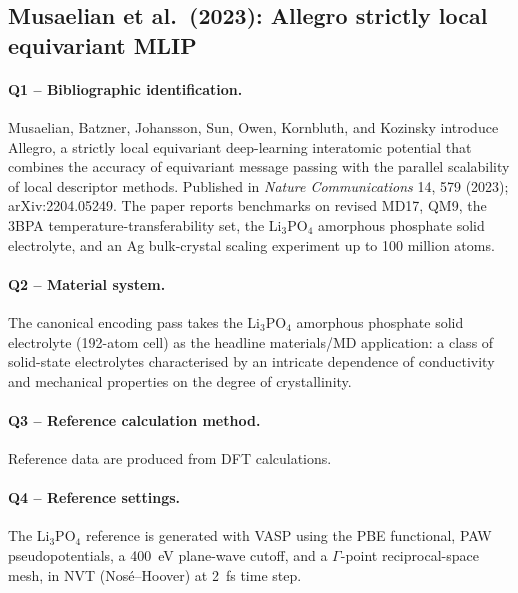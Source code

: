 \subsection{Musaelian et al.\ (2023): Allegro strictly local equivariant MLIP}
\label{sec:appendix-example-musaelian2023allegro}

\paragraph{Q1 -- Bibliographic identification.}
Musaelian, Batzner, Johansson, Sun, Owen, Kornbluth, and Kozinsky
introduce Allegro, a strictly local equivariant deep-learning
interatomic potential that combines the accuracy of equivariant
message passing with the parallel scalability of local descriptor
methods. Published in \emph{Nature Communications} 14, 579 (2023);
arXiv:2204.05249. The paper reports benchmarks on revised MD17,
QM9, the 3BPA temperature-transferability set, the Li$_3$PO$_4$
amorphous phosphate solid electrolyte, and an Ag bulk-crystal
scaling experiment up to 100 million atoms.


\paragraph{Q2 -- Material system.}
The canonical encoding pass takes the Li$_3$PO$_4$ amorphous
phosphate solid electrolyte (192-atom cell) as the headline
materials/MD application: a class of solid-state electrolytes
characterised by an intricate dependence of conductivity and
mechanical properties on the degree of crystallinity.


\paragraph{Q3 -- Reference calculation method.}
Reference data are produced from DFT calculations.


\paragraph{Q4 -- Reference settings.}
The Li$_3$PO$_4$ reference is generated with VASP using the PBE
functional, PAW pseudopotentials, a 400~eV plane-wave cutoff, and a
$\Gamma$-point reciprocal-space mesh, in NVT (Nos\'e--Hoover) at
2~fs time step.


